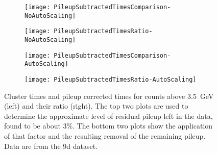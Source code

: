 \begin{landscape}
    \begin{figure}
    \centering
        \begin{subfigure}[]{0.6\textwidth}
            \centering
            \texttt{[image: PileupSubtractedTimesComparison-NoAutoScaling]}
        \end{subfigure}%
        \hspace{1cm}
        \begin{subfigure}[]{0.6\textwidth}
            \centering
            \texttt{[image: PileupSubtractedTimesRatio-NoAutoScaling]}
        \end{subfigure}

        \begin{subfigure}[]{0.6\textwidth}
            \centering
            \texttt{[image: PileupSubtractedTimesComparison-AutoScaling]}
        \end{subfigure}%
        \hspace{1cm}
        \begin{subfigure}[]{0.6\textwidth}
            \centering
            \texttt{[image: PileupSubtractedTimesRatio-AutoScaling]}
        \end{subfigure}
    \caption[Cluster times above \SI{3.5}{\GeV}]{Cluster times and pileup corrected times for counts above \SI{3.5}{\GeV} (left) and their ratio (right). The top two plots are used to determine the approximate level of residual pileup left in the data, found to be about 3\%. The bottom two plots show the application of that factor and the resulting removal of the remaining pileup. Data are from the 9d dataset.}
    \label{fig:PileupTimesRatio}
    \end{figure}
\end{landscape}


